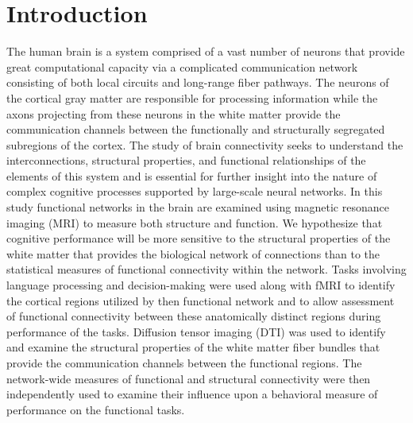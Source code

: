 \section{Introduction}
\label{Intro}
The human brain is a system comprised of a vast number of neurons that provide great computational capacity via a complicated communication network consisting of both local circuits and long-range fiber pathways. The neurons of the cortical gray matter are responsible for processing information while the axons projecting from these neurons in the white matter provide the communication channels between the functionally and structurally segregated subregions of the cortex. The study of brain connectivity seeks to understand the interconnections, structural properties, and functional relationships of the elements of this system and is essential for further insight into the nature of complex cognitive processes supported by large-scale neural networks. In this study functional networks in the brain are examined using magnetic resonance imaging (MRI) to measure both structure and function. We hypothesize that cognitive performance will be more sensitive to the structural properties of the white matter that provides the biological network of connections than to the statistical measures of functional connectivity within the network. Tasks involving language processing and decision-making were used along with fMRI to identify the cortical regions utilized by then functional network and to allow assessment of functional connectivity between these anatomically distinct regions during performance of the tasks. Diffusion tensor imaging (DTI) was used to identify and examine the structural properties of the white matter fiber bundles that provide the communication channels between the functional regions. The network-wide measures of functional and structural connectivity were then independently used to examine their influence upon a behavioral measure of performance on the functional tasks.

